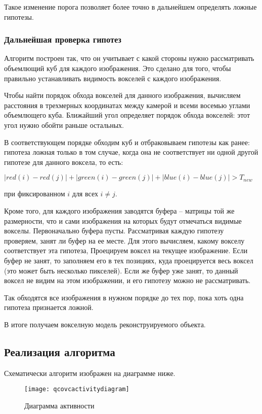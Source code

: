 Такое изменение порога позволяет более точно в дальнейшем определять ложные гипотезы.

\subsubsection{Дальнейшая проверка гипотез}

Алгоритм построен так, что он учитывает с какой стороны нужно рассматривать объемлющий куб для каждого изображения. Это сделано для того, чтобы правильно устанавливать видимость вокселей с каждого изображения. 

Чтобы найти порядок обхода вокселей для данного изображения, вычисляем расстояния в трехмерных координатах между камерой и всеми восемью углами объемлющего куба. Ближайший угол определяет порядок обхода вокселей: этот угол нужно обойти раньше остальных. 

В соответствующем порядке обходим куб и отбраковываем гипотезы как ранее:   
гипотеза ложная только в том случае, когда она не соответствует ни одной другой гипотезе для данного воксела, то есть:

\begin{center}
	$\lvert {red(i)} - {red(j)}\rvert + \lvert {green(i)} - {green(j)}\rvert + \lvert {blue(i)} - {blue(j)}\rvert > T_{new}$
\end{center}
при фиксированном $i$ для всех $i \neq j$.

Кроме того, для каждого изображения заводятся буфера – матрицы той же размерности, что и сами изображения на которых будут отмечаться видимые вокселы. Первоначально буфера пусты. Рассматривая каждую гипотезу проверяем, занят ли буфер на ее месте. Для этого вычисляем, какому вокселу соответствует эта гипотеза, Проецируем воксел на текущее изображение. Если буфер не занят, то заполняем его в тех  позициях, куда проецируется весь воксел (это может быть несколько пикселей). Если же буфер уже занят, то данный воксел не видим на этом изображении, и его гипотезу можно не рассматривать.    

Так обходятся все изображения в нужном порядке до тех пор, пока хоть одна гипотеза признается ложной. 

В итоге получаем вокселную модель реконструируемого объекта.

\newpage
\subsection{Реализация алгоритма}
Схематически алгоритм изображен на диаграмме ниже.
\begin{figure}[h]
\center
\texttt{[image: qcovcactivitydiagram]}
\caption{Диаграмма активности}
\end{figure}

